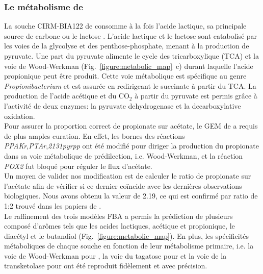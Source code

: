 \documentclass[../main.tex]{subfiles}
\begin{document}
\subsubsection{Le métabolisme de \freud}

La souche CIRM-BIA122 de \freud consomme à la fois l'acide lactique, sa principale source de carbone \citep*{Thierry2011,Dank2021} ou le lactose \citep{Loux2015}. L'acide lactique et le lactose sont catabolisé par les voies de la glycolyse et des penthose-phosphate, menant à la production de pyruvate. Une part du pyruvate alimente le cycle des tricarboxylique (TCA) et la voie de Wood-Werkman  (Fig.~\ref{figure:metabolic_map}~c) durant laquelle l'acide propionique peut être produit. Cette voie métabolique est spécifique au genre \textit{Propionibacterium} et est assurée en redirigeant le succinate à partir du TCA. La production de l'acide acétique  et du CO$_2$ \citep{Turgay2020} à partir du pyruvate est permis grâce à l'activité de deux enzymes: la pyruvate dehydrogenase et la decarboxylative oxidation. \\
Pour assurer la proportion correct de propionate sur acétate, le GEM de \freud a requis de plus amples curation. En effet, les bornes des réactions \textit{PPAKr},\textit{PTAr},\textit{2131pyrpp} ont été modifié pour diriger la production du propionate dans sa voie métabolique de prédilection, i.e. Wood-Werkman, et la réaction \textit{POX2} fut bloqué pour réguler le flux d'acétate.\\
Un moyen de valider nos modification est de calculer le ratio de propionate sur l'acétate afin de vérifier si ce dernier coïncide avec les dernières observations biologiques. Nous avons obtenu la valeur de 2.19, ce qui est confirmé par ratio de 1:2 trouvé dans les papiers de  \citep{Crow1986,Dank2021,Cao.2021, Turgay2020}. \\


Le raffinement des trois modèles FBA a permis la prédiction de plusieurs composé d'arômes tels que les acides lactiques, acétique et propionique, le diacétyl et le butandiol \citep{Smid2014, Cao.2021} (Fig.~\ref{figure:metabolic_map}). En plus, les spécificités métaboliques de chaque souche en fonction de leur métabolisme primaire, i.e. la voie de Wood-Werkman pour \freud, la voie du tagatose pour \lactis et la voie de la transketolase pour \plantarum ont été reproduit fidèlement et avec précision.
\end{document}

